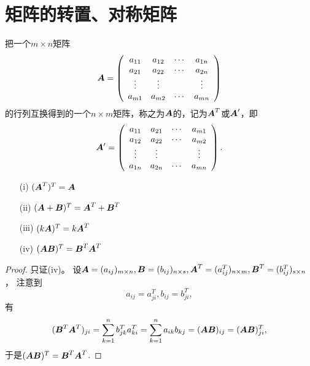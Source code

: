 \section{矩阵的转置、对称矩阵}
\begin{frame}
\begin{dingyi}[转置矩阵]
  把一个$m\times n$矩阵
  $$
  \boldsymbol{A} = \left(
    \begin{array}{cccc}
      a_{11} & a_{12} & \cdots & a_{1n} \\
      a_{21} & a_{22} & \cdots & a_{2n} \\
      \vdots   & \vdots &  & \vdots \\
      a_{m1} & a_{m2} & \cdots & a_{mn} 
    \end{array}
  \right)
  $$
  的行列互换得到的一个$n\times m$矩阵，称之为$\boldsymbol{A}$的，记为$\boldsymbol{A}^T$或$\boldsymbol{A}^\prime$，即
  $$
  \boldsymbol{A}^\prime = \left(
    \begin{array}{cccc}
      a_{11} & a_{21} & \cdots & a_{m1} \\
      a_{12} & a_{22} & \cdots & a_{m2} \\
      \vdots   & \vdots &  & \vdots \\
      a_{1n} & a_{2n} & \cdots & a_{mn} 
    \end{array}
  \right).
  $$  
\end{dingyi}
\end{frame}

\begin{frame}
\begin{dingli}[矩阵转置的运算律]
  \begin{itemize}
  \item[(i)] $(\boldsymbol{A}^T)^T=\boldsymbol{A}$
  \item[(ii)] $(\boldsymbol{A}+\boldsymbol{B})^T=\boldsymbol{A}^T+\boldsymbol{B}^T$
  \item[(iii)] $(k\boldsymbol{A})^T= k\boldsymbol{A}^T$
  \item[(iv)] $(\boldsymbol{A}\boldsymbol{B})^T=\boldsymbol{B}^T\boldsymbol{A}^T$
  \end{itemize}
\end{dingli}
\end{frame}

\begin{frame}
\begin{proof}
  只证(iv)。 设$\boldsymbol{A}=(a_{ij})_{m\times n}, \boldsymbol{B}=(b_{ij})_{n\times s}, \boldsymbol{A}^T=(a_{ij}^T)_{n\times m}, \boldsymbol{B}^T=(b_{ij}^T)_{s\times n}$，
  注意到
  $$a_{ij} = a_{ji}^T, b_{ij} = b_{ji}^T,$$  
  有
  $$
  (\boldsymbol{B}^T\boldsymbol{A}^T)_{ji} = \sum_{k=1}^n b_{jk}^Ta_{ki}^T  = \sum_{k=1}^n a_{ik}b_{kj}  = (\boldsymbol{A}\boldsymbol{B})_{ij}  = (\boldsymbol{A}\boldsymbol{B})_{ji}^T,
  $$ 
  于是$(\boldsymbol{A}\boldsymbol{B})^T=\boldsymbol{B}^T\boldsymbol{A}^T$.
\end{proof}
\end{frame}

